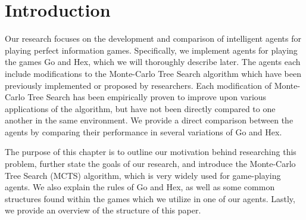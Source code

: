 %
%

\chapter{Introduction}\label{ch:intro} %


Our research focuses on the development and comparison of intelligent agents for playing perfect information games.  Specifically, we implement agents for playing the games Go and Hex, which we will thoroughly describe later.  The agents each include modifications to the Monte-Carlo Tree Search algorithm which have been previously implemented or proposed by researchers.  Each modification of Monte-Carlo Tree Search has been empirically proven to improve upon various applications of the algorithm, but have not been directly compared to one another in the same environment.  We provide a direct comparison between the agents by comparing their performance in several variations of Go and Hex.

The purpose of this chapter is to outline our motivation behind researching this problem, further state the goals of our research, and introduce the Monte-Carlo Tree Search (MCTS) algorithm, which is very widely used for game-playing agents.  We also explain the rules of Go and Hex, as well as some common structures found within the games which we utilize in one of our agents.  Lastly, we provide an overview of the structure of this paper.

